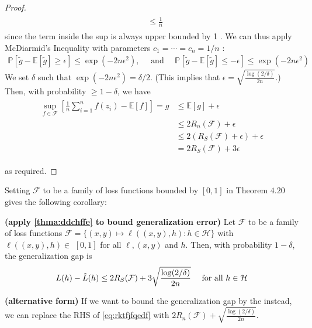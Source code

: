 \documentclass{article}
\newcommand{\bfs}[1]{\textbf{({#1}) }}
\begin{document}
\begin{proof}
\begin{align*}
\begin{aligned}
&\leq \frac{1}{n}
\end{aligned}
\end{align*}
since the term inside the sup is always upper bounded by 1 . We can thus apply McDiarmid's Inequality with parameters $c_{1}=\cdots=c_{n}=1 / n$ :
\begin{align*}
\mathbb{P}[\tilde{g}-\mathbb{E}[\tilde{g}] \geq \epsilon] \leq \exp \left(-2 n \epsilon^{2}\right), \quad \text { and } \quad \mathbb{P}[\tilde{g}-\mathbb{E}[\tilde{g}] \leq-\epsilon] \leq \exp \left(-2 n \epsilon^{2}\right)
\end{align*}
 We set $\delta$ such that $\exp \left(-2 n \epsilon^{2}\right)=\delta / 2$. (This implies that $\epsilon=\sqrt{\frac{\log (2 / \delta)}{2 n}}$.) Then, with probability $\geq 1-\delta$, we have 
\begin{align*}
\begin{aligned}
\sup _{f \in \mathcal{F}}\left[\frac{1}{n} \sum_{i=1}^{n} f\left(z_{i}\right)-\mathbb{E}[f]\right]=g & \leq \mathbb{E}[g]+\epsilon \\
& \leq 2 R_{n}(\mathcal{F})+\epsilon \\
& \leq 2\left(R_{S}(\mathcal{F})+\epsilon\right)+\epsilon \\
&=2 R_{S}(\mathcal{F})+3 \epsilon
\end{aligned}
\end{align*}


as required.
\end{proof} 
Setting $\mathcal{F}$ to be a family of loss functions bounded by $[0,1]$ in Theorem $4.20$ gives the following corollary:
\begin{cora}\bfs{apply \cref{thma:ddchffe} to bound generalization error}
Let $\mathcal{F}$ to be a family of loss functions $\mathcal{F}=\{(x, y) \mapsto \ell((x, y), h): h \in \mathcal{H}\}$ with $\ell((x, y), h) \in$ $[0,1]$ for all $\ell,(x, y)$ and $h .$ Then, with probability $1-\delta$, the generalization gap is
\begin{align}
L(h)-\hat{L}(h) \leq 2 R_{S}(\mathcal{F})+3 \sqrt{\frac{\log (2 / \delta)}{2 n}} \quad \text { for all } h \in \mathcal{H}\label{eq:rktfjfqedf}
\end{align}
\end{cora} 
\begin{rema}\bfs{alternative form}\label{eq:hererqrewytr}
If we want to bound the generalization gap by the  instead, we can replace the RHS of \cref{eq:rktfjfqedf} with $2 R_{n}(\mathcal{F})+\sqrt{\frac{\log (2 / \delta)}{2 n}}$.
\end{rema} 
\end{document}
